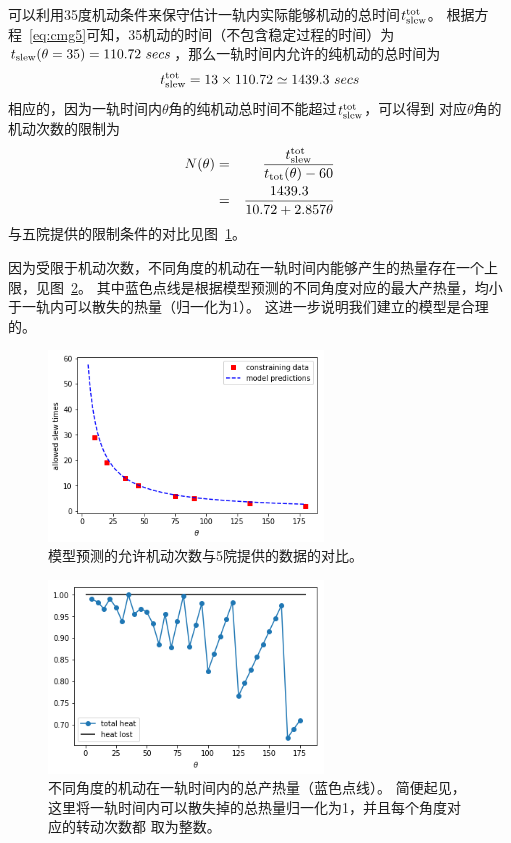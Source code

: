 \documentclass[a4paper,11pt]{ctexart}
\begin{document}
可以利用35度机动条件来保守估计一轨内实际能够机动的总时间$t^{\rm tot}_{\rm slew}$。
根据方程~\eqref{eq:cmg5}可知，35\textdegree 机动的时间（不包含稳定过程的时间）为
$t_{\rm slew}(\theta=35)=110.72~ secs$，那么一轨时间内允许的纯机动的总时间为
\begin{eqnarray}
t^{\rm tot}_{\rm slew} = 13\times110.72\simeq 1439.3~secs
\end{eqnarray}
相应的，因为一轨时间内$\theta$角的纯机动总时间不能超过$t^{\rm tot}_{\rm slew}$，可以得到
对应$\theta$角的机动次数的限制为
\begin{eqnarray}
N(\theta) 
&=& \frac{t^{\rm tot}_{\rm slew}}{t_{\rm tot}(\theta) -60}\\
&=& \frac{1439.3}{10.72+2.857\theta}
\end{eqnarray}
与五院提供的限制条件的对比见图~\ref{fig:cmg_rot1}。

因为受限于机动次数，不同角度的机动在一轨时间内能够产生的热量存在一个上限，见图~\ref{fig:cmg_rot2}。
其中蓝色点线是根据模型预测的不同角度对应的最大产热量，均小于一轨内可以散失的热量（归一化为1）。
这进一步说明我们建立的模型是合理的。

\begin{figure}[h!]
\centering
\includegraphics[width=0.65\textwidth]{figures/cmg_rot2.png}
\caption{模型预测的允许机动次数与5院提供的数据的对比。}
\label{fig:cmg_rot1}
\end{figure}

\begin{figure}[h!]
\centering
\includegraphics[width=0.65\textwidth]{figures/cmg_rot3.png}
\caption{不同角度的机动在一轨时间内的总产热量（蓝色点线）。
简便起见，这里将一轨时间内可以散失掉的总热量归一化为1，并且每个角度对应的转动次数都
取为整数。}
\label{fig:cmg_rot2}
\end{figure}
\end{document}
